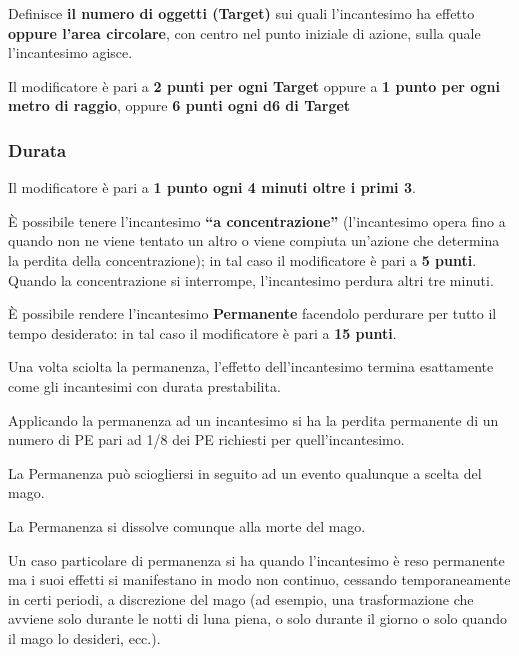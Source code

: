 Definisce \textbf{il numero di oggetti (Target)} sui quali
l'incantesimo ha effetto \textbf{oppure l'area circolare}, con centro
nel punto iniziale di azione, sulla quale l'incantesimo agisce. 

Il
modificatore \`e pari a \textbf{2 punti per ogni Target} oppure a \textbf{1 punto
per ogni metro di raggio}, oppure \textbf{6 punti ogni d6 di Target}


\subsubsection{Durata} 
Il modificatore \`e pari a \textbf{1 punto ogni 4 minuti oltre i
  primi 3}.

\`E possibile tenere l'incantesimo \textbf{``a concentrazione''}
(l'incantesimo opera fino a quando non ne viene tentato un altro o
viene compiuta un'azione che determina la perdita della
concentrazione); in tal caso il modificatore \`e pari a \textbf{5
  punti}. Quando la concentrazione si interrompe, l'incantesimo
perdura altri tre minuti.

\`E possibile rendere l'incantesimo \textbf{Permanente} facendolo
perdurare per tutto il tempo desiderato: in tal caso il modificatore
\`e pari a \textbf{15 punti}. 

Una volta sciolta la permanenza, l'effetto dell'incantesimo termina
esattamente come gli incantesimi con durata prestabilita.

Applicando la permanenza ad un incantesimo si ha la perdita permanente
di un numero di PE pari ad 1/8 dei PE richiesti per quell'incantesimo.


La Permanenza pu\`o sciogliersi in seguito ad un evento qualunque a
scelta del mago.

La Permanenza si dissolve comunque alla morte del mago.

\iffullversion
Un caso particolare di permanenza si ha quando l'incantesimo \`e
reso permanente ma i suoi effetti si manifestano in modo non continuo,
cessando temporaneamente in certi periodi, a discrezione del mago (ad
esempio, una trasformazione che avviene solo durante le notti di luna
piena, o solo durante il giorno o solo quando il mago lo desideri,
ecc.). 

